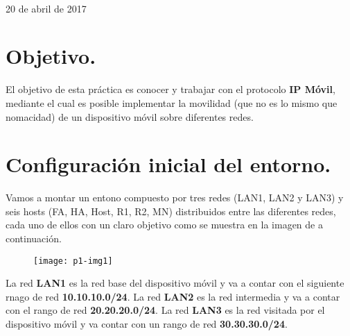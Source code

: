 \documentclass[10pt]{article}
\begin{document}
\begin{center}
 		\\																		%
\vspace{2cm} 																				
\begin{center}																					
{\large 20 de abril de 2017}																	%
 			\end{center}												  						
\end{center}							 											
																					
\newpage																		

\tableofcontents 

\newpage

\section{Objetivo.}

El objetivo de esta práctica es conocer y trabajar con el protocolo \textbf{IP Móvil}, mediante el cual es posible implementar la movilidad (que no es lo mismo que nomacidad) de un dispositivo móvil sobre diferentes redes.\\



\section{Configuración inicial del entorno.} 

Vamos a montar un entono compuesto por tres redes (LAN1, LAN2 y LAN3) y seis hosts (FA, HA, Host, R1, R2, MN) distribuidos entre las diferentes redes, cada uno de ellos con un claro objetivo como se muestra en la imagen de a continuación.\\ 


\begin{figure}[H]
	\begin{center}
 		\texttt{[image: p1-img1]}
	\end{center} 
\end{figure}

La red \textbf{LAN1} es la red base del dispositivo móvil y va a contar con el siguiente rnago de red \textbf{10.10.10.0/24}. La red \textbf{LAN2} es la red intermedia y va a contar con el rango de red \textbf{20.20.20.0/24}. La red \textbf{LAN3} es la red visitada por el dispositivo móvil y va contar con un rango de red \textbf{30.30.30.0/24}. \\
\end{document}
